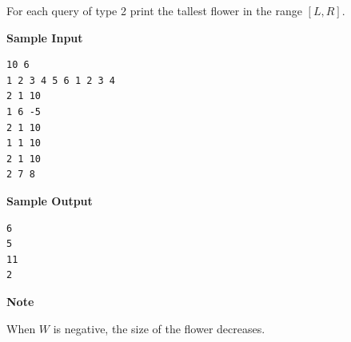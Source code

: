 \documentclass[11pt]{article}
\begin{document}
For each query of type 2 print the tallest flower in the range $[L, R]$.

\textbf{\large Sample Input}

\begin{verbatim}
10 6
1 2 3 4 5 6 1 2 3 4
2 1 10
1 6 -5
2 1 10
1 1 10
2 1 10
2 7 8
\end{verbatim}

\textbf{\large Sample Output}

\begin{verbatim}
6
5
11
2
\end{verbatim}

\textbf{\large Note}

When $W$ is negative, the size of the flower decreases.

\newpage

    
\end{document}
